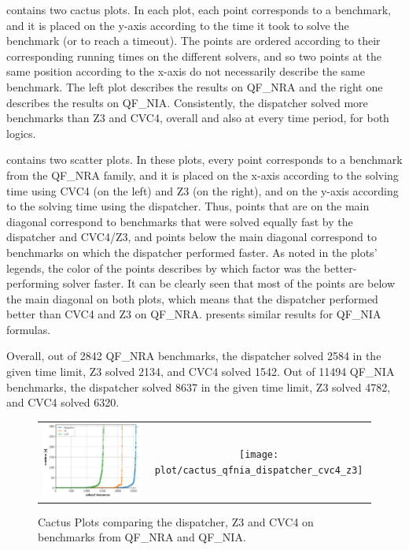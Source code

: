 \documentclass{article}
\begin{document}
 contains two cactus plots.
In each plot, each point corresponds to a benchmark, and it
is placed on the y-axis according to the time
it took to solve the benchmark (or to reach a timeout).
The points are ordered according to their corresponding
running times on the different solvers, and so
two points at the same position according to the x-axis
do not necessarily describe the same benchmark.
The left plot describes the results on QF\_NRA and
the right one describes the results on QF\_NIA.
Consistently, the dispatcher solved more benchmarks
than Z3 and CVC4, overall and also at every time period,
for both logics.

 contains two scatter plots.
In these plots, every point corresponds to a benchmark
from the QF\_NRA family,
and it is placed on the x-axis according to the
solving time using CVC4 (on the left) and Z3 (on the right),
and on the y-axis according to the solving time using
the dispatcher.
%
Thus, points that are on the main diagonal correspond to benchmarks that
were solved equally fast by the dispatcher and CVC4/Z3,
and points below the main diagonal correspond
to benchmarks on which the dispatcher performed
faster.
%
As noted in the plots' legends, the color of the points
describes by which factor was the better-performing solver faster.
%
It can be clearly seen that most of the points are below the main diagonal on both plots,
which means that the dispatcher performed better
than CVC4 and Z3 on QF\_NRA.
%
 presents similar results for QF\_NIA formulas.

Overall, out of 2842 QF\_NRA benchmarks,
the dispatcher solved 2584 in the given time limit,
Z3 solved 2134, and
CVC4 solved 1542.
%
Out of 11494 QF\_NIA benchmarks,
the dispatcher solved 8637 in the given time limit,
Z3 solved 4782, and
CVC4 solved 6320.


\begin{figure}
\begin{center}
\begin{tabular}{cc}
\includegraphics[width=.5\textwidth]{plot/cactus_qfnra_dispatcher_cvc4_z3}
&
\texttt{[image: plot/cactus\_qfnia\_dispatcher\_cvc4\_z3]}  
\end{tabular}
\end{center}
\caption{\label{cactus}Cactus Plots comparing the dispatcher, Z3 and CVC4 on benchmarks from QF\_NRA and QF\_NIA.}
\end{figure}
\end{document}
